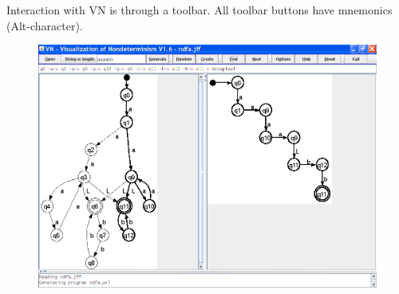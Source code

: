 \documentclass[11pt]{article}
\begin{document}
Interaction with VN is through a toolbar. All toolbar buttons have mnemonics 
(Alt-character).

\begin{figure}[htbp]
\begin{center}
\includegraphics[width=.8\textwidth,keepaspectratio=true]{vn.png}
\end{center}
\end{figure}
 
\end{document}
